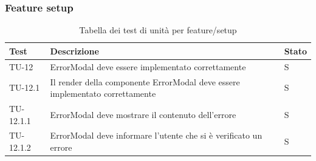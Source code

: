 \subsubsection{Feature setup}
\renewcommand{\arraystretch}{1.5}
\begin{xltabular}{0.9\textwidth}{X | p{0.6\textwidth} | p{0.1\textwidth} }
    \textbf{\color{white} Test} & \textbf{\color{white} Descrizione} & \textbf{\color{white} Stato}\\ 
    \hline
    \endhead
    \caption{Tabella dei test di unità per feature/setup} 
    \label{tab:test_sistema}
    \endlastfoot
    TU-12 & ErrorModal deve essere implementato correttamente & S\\
    TU-12.1 & Il render della componente ErrorModal deve essere implementato correttamente & S\\
    TU-12.1.1 & ErrorModal deve mostrare il contenuto dell'errore & S\\
    TU-12.1.2 & ErrorModal deve informare l'utente che si è verificato un errore & S\\
    

\end{xltabular}
